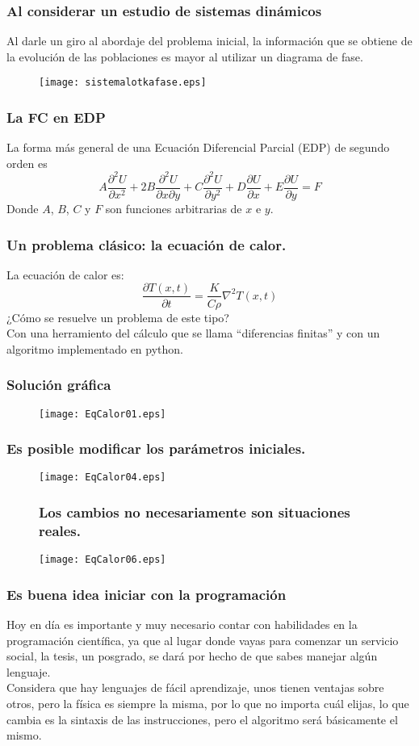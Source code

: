 \documentclass[12pt]{beamer}
\begin{document}
\begin{frame}
\frametitle{Al considerar un estudio de sistemas dinámicos}
Al darle un giro al abordaje del problema inicial, la información que se obtiene de la evolución de las poblaciones es mayor al utilizar un diagrama de fase.
\\
\begin{figure}
\centering
\texttt{[image: sistemalotkafase.eps]}
\end{figure}
\end{frame}
\begin{frame}
\frametitle{La FC en EDP}
La forma más general de una Ecuación Diferencial Parcial (EDP) de segundo orden es
\[ A \dfrac{\partial^{2} U}{\partial x^{2}} + 2B \dfrac{\partial^{2} U}{\partial x \partial y} + C \dfrac{\partial^{2} U}{\partial y^{2}} + D \dfrac{\partial U}{\partial x} + E \dfrac{\partial U}{\partial y} = F \]
Donde $A$, $B$, $C$ y $F$ son funciones arbitrarias de $x$ e $y$.
\end{frame}
\begin{frame}
\frametitle{Un problema clásico: la ecuación de calor.}
La ecuación de calor es:
\[ \dfrac{\partial T(x,t)}{\partial t} = \dfrac{K}{C \rho} \nabla^{2} T(x,t)\]
¿Cómo se resuelve un problema de este tipo?
\\
\medskip
\pause
Con una herramiento del cálculo que se llama ``diferencias finitas'' y con un algoritmo implementado en python.
\end{frame}
\begin{frame}
\frametitle{Solución gráfica}
\begin{figure}
	\centering
	\texttt{[image: EqCalor01.eps]}  
\end{figure}
\end{frame}
\begin{frame}
\frametitle{Es posible modificar los parámetros iniciales.}
\begin{figure}
	\centering
	\texttt{[image: EqCalor04.eps]}  
\end{figure}
\end{frame}
\begin{frame}
\begin{figure}
\frametitle{Los cambios no necesariamente son situaciones reales.}
	\centering
	\texttt{[image: EqCalor06.eps]}  
\end{figure}
\end{frame}
\begin{frame}
\frametitle{Es buena idea iniciar con la programación}
Hoy en día es importante y muy necesario contar con habilidades en la programación científica, ya que al lugar donde vayas para comenzar un servicio social, la tesis, un posgrado, se dará por hecho de que sabes manejar algún lenguaje.
\\
\bigskip
Considera que hay lenguajes de fácil aprendizaje, unos tienen ventajas sobre otros, pero la física es siempre la misma, por lo que no importa cuál elijas, lo que cambia es la sintaxis de las instrucciones, pero el algoritmo será básicamente el mismo.
\end{frame}
\end{document}
